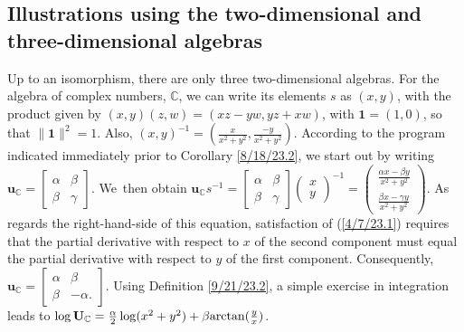 \documentclass{amsart}
\numberwithin{equation}{section}
\theoremstyle{definition}
\numberwithin{theorem}{section}
\begin{document}
\medskip

\subsection{Illustrations using the two-dimensional and three-dimensional algebras}
Up to an isomorphism, there are only three two-dimensional algebras.
For the algebra of complex numbers, $\mathbb{C}$, we can write its elements $s$ as $(x,y)$, with the product given by $(x,y)(z,w) = (xz-yw, yz+xw)$, with $\mathbf{1}=(1,0)$, so that $\|\mathbf{1}\|^2=1$.  Also, $(x,y)^{-1} = (\frac{x}{x^2+y^2},\frac{-y}{x^2+y^2})$.  According to the program indicated immediately prior to Corollary \ref{8/18/23.2}, we start out by writing  $\mathbf{u}_\mathbb{C} = \left[\begin{array}{ccc}
 \alpha & \beta   \\ 
 \beta & \gamma    
\end{array}\right]$.  \mbox{We then} obtain  $\mathbf{u}_\mathbb{C}s^{-1} = \left[\begin{array}{ccc}
 \alpha & \beta   \\ 
 \beta & \gamma    
\end{array}\right]\left(\begin{array}{ccc}
x   \\ 
y   
\end{array}\right)^{-1} = \left(\begin{array}{ccc}
\frac{\alpha x - \beta y}{x^2+y^2}  \\ 
\frac{\beta x - \gamma y}{x^2+y^2} 
\end{array}\right)$.  As regards the right-hand-side of this equation, satisfaction of (\ref{4/7/23.1}) requires that the partial derivative with respect to $x$ of the second component must equal the partial derivative with respect to $y$ of the first component.  Consequently, $\mathbf{u}_{\mathbb{C}} = \left[\begin{array}{ccc}
 \alpha & \beta   \\ 
 \beta & -\alpha.    
\end{array}\right]$.  Using Definition \ref{9/21/23.2}, a simple exercise in integration leads to $\log  \mathbf{U}_{\mathbb{C}} = \frac{\alpha}{2}\log(x^2+y^2) + \beta{\rm arctan}(\frac{y}{x})$.
\end{document}
